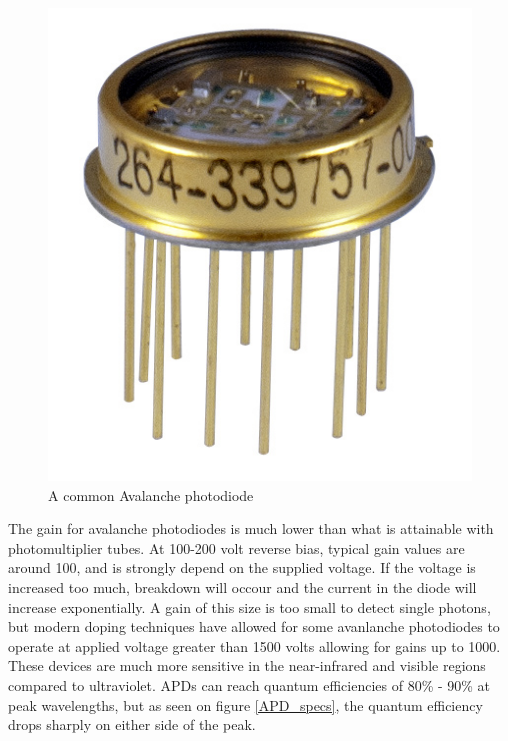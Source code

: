 \begin{figure}[htb]
\begin{center}
\includegraphics[scale=0.6]{figures/RCS/APD}
\caption{A common Avalanche photodiode}
\label{fig:APD}
\end{center}
\end{figure}

The gain for avalanche photodiodes is much lower than what is attainable with photomultiplier tubes. At 100-200 volt reverse bias, typical gain values are around 100, and is strongly depend on the supplied voltage.  If the voltage is increased too much, breakdown will occour and the current in the diode will increase exponentially. A gain of this size is too small to detect single photons, but modern doping techniques have allowed for some avanlanche photodiodes to operate at applied voltage greater than 1500 volts allowing for gains up to 1000. These devices are much more sensitive in the near-infrared and visible regions compared to ultraviolet. APDs can reach quantum efficiencies of 80\% - 90\% at peak wavelengths, but as seen on figure \ref{APD_specs}, the quantum efficiency drops sharply on either side of the peak.

